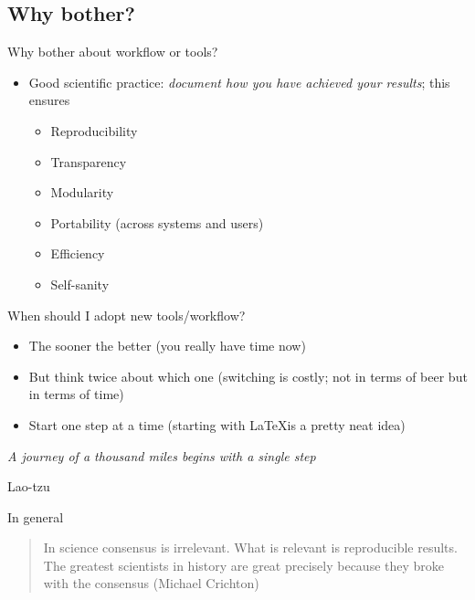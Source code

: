 \documentclass[ignorenonframetext,]{beamer}
\begin{document}
\subsection{Why bother?}\label{why-bother}

\begin{frame}{Why bother about workflow or tools?}

\begin{itemize}
\item
  Good scientific practice: \emph{document how you have achieved your
  results}; this ensures

  \begin{itemize}
  \itemsep1pt\parskip0pt
  \item
    Reproducibility
  \item
    Transparency
  \item
    Modularity
  \item
    Portability (across systems and users)
  \item
    Efficiency
  \item
    Self-sanity
  \end{itemize}
\end{itemize}

\end{frame}

\begin{frame}{When should I adopt new tools/workflow?}

\begin{itemize}
\itemsep1pt\parskip0pt
\item
  The sooner the better (you really have time now)
\item
  But think twice about which one (switching is costly; not in terms of
  beer but in terms of time)
\item
  Start one step at a time (starting with \LaTeX is a pretty neat idea)
\end{itemize}

\emph{A journey of a thousand miles begins with a single step}

Lao-tzu

\end{frame}

\begin{frame}{In general}

\begin{quote}
In science consensus is irrelevant. What is relevant is reproducible
results. The greatest scientists in history are great precisely because
they broke with the consensus (Michael Crichton)
\end{quote}

\end{frame}
\end{document}
